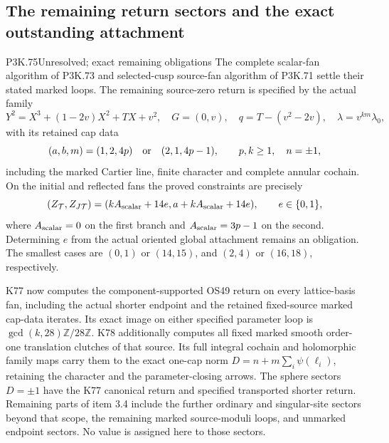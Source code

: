 \subsection{The remaining return sectors and the exact outstanding attachment}
\begin{statement}{P3K.75}{Unresolved; exact remaining obligations}
The complete scalar-fan algorithm of P3K.73 and selected-cusp
source-fan algorithm of P3K.71 settle their stated marked loops.
The remaining source-zero return is specified by the actual family
\[
 Y^2=X^3+(1-2v)X^2+TX+v^2,\quad G=(0,v),\quad
 q=T-(v^2-2v),\quad \lambda=v^{km}\lambda_0,
\]
with its retained cap data
\[
 (a,b,m)=(1,2,4p)\quad\hbox{or}\quad(2,1,4p-1),
 \qquad p,k\ge1,\quad n=\pm1,
\]
including the marked Cartier line, finite character and complete
annular cochain. On the initial and reflected fans the proved
constraints are precisely
\[
 (Z_{\mathcal T},Z_{J\mathcal T})=
 (kA_{\rm scalar}+14e,a+kA_{\rm scalar}+14e),\qquad
 e\in\{0,1\},
\]
where \(A_{\rm scalar}=0\) on the first branch and
\(A_{\rm scalar}=3p-1\) on the second. Determining \(e\)
from the actual oriented global attachment remains an obligation.
The smallest cases are \((0,1)\) or \((14,15)\), and
\((2,4)\) or \((16,18)\), respectively.

K77 now computes the component-supported OS49 return on every
lattice-basis fan, including the actual shorter endpoint and
the retained fixed-source marked cap-data iterates. Its exact
image on either specified parameter loop is
\(\gcd(k,28)\mathbb Z/28\mathbb Z\).
K78 additionally computes all fixed marked smooth order-one
translation clutches of that source. Its full integral cochain
and holomorphic family maps carry them to the exact one-cap norm
\(D=n+m\sum_i\psi(\ell_i)\), retaining the character and the
parameter-closing arrows. The sphere sectors \(D=\pm1\) have the
K77 canonical return and specified transported shorter return.
Remaining parts of item 3.4 include the further ordinary and
singular-site sectors beyond that scope, the remaining marked
source-moduli loops, and unmarked endpoint sectors. No value is
assigned here to those sectors.
\end{statement}
